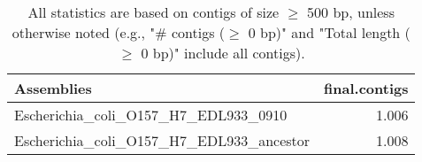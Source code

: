 \documentclass[12pt,a4paper]{article}
\begin{document}
\begin{table}[ht]
\begin{center}
\caption{All statistics are based on contigs of size $\geq$ 500 bp, unless otherwise noted (e.g., "\# contigs ($\geq$ 0 bp)" and "Total length ($\geq$ 0 bp)" include all contigs).}
\begin{tabular}{|l*{1}{|r}|}
\hline
Assemblies & final.contigs \\ \hline
Escherichia\_coli\_O157\_H7\_EDL933\_0910 & 1.006 \\ \hline
Escherichia\_coli\_O157\_H7\_EDL933\_ancestor & 1.008 \\ \hline
\end{tabular}
\end{center}
\end{table}
\end{document}
